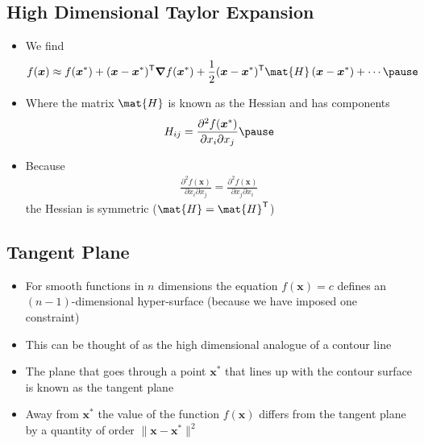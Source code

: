 \begin{slide}
\section[-1]{High Dimensional  Taylor Expansion}

\begin{PauseHighLight}
  \begin{itemize}
  \item We find
    \begin{align*}
      f(\bm{x}) &\approx f(\bm{x}^*) + (\bm{x}-\bm{x}^*)^\tr \grad
                  f(\bm{x}^*)
                  + \frac{1}{2} (\bm{x}-\bm{x}^*)^\tr
                  \mat{H}\,(\bm{x}-\bm{x}^*) + \cdots\pause
    \end{align*}
  \item Where the matrix $\mat{H}$ is known as the Hessian and has
    components
    \begin{align*}
      H_{ij} = \frac{\partial^2 f(\bm{x}^*)}{\partial x_i\partial x_j}\pause
    \end{align*}
  \item Because
    \begin{align*}
      \frac{\partial^2 f(\bm{x})}{\partial x_i\partial x_j} = \frac{\partial^2 f(\bm{x})}{\partial x_j\partial x_i}
    \end{align*}
    the Hessian is symmetric\pause{} ($\mat{H} = \mat{H}^\tr$)\pauseb
  \end{itemize}
\end{PauseHighLight}

\end{slide}


\begin{slide}
\section{Tangent Plane}

\begin{PauseHighLight}
  \begin{itemize}
  \item For smooth functions in $n$ dimensions the equation
    $f(\bm{x}) = c$ defines an $(n-1)$-dimensional hyper-surface\pause{}
    (because we have imposed one constraint)\pauseb
  \item This can be thought of as the high dimensional analogue of a
    contour line\pause
  \item The plane that goes through a point $\bm{x}^*$ that lines up
    with the contour surface is known as the tangent plane\pause
  \item Away from $\bm{x}^*$ the value of the function $f(\bm{x})$
    differs from the tangent plane by a quantity of order $\|\bm{x}-\bm{x}^*\|^2$\pause
  \end{itemize}
\end{PauseHighLight}

\end{slide}


